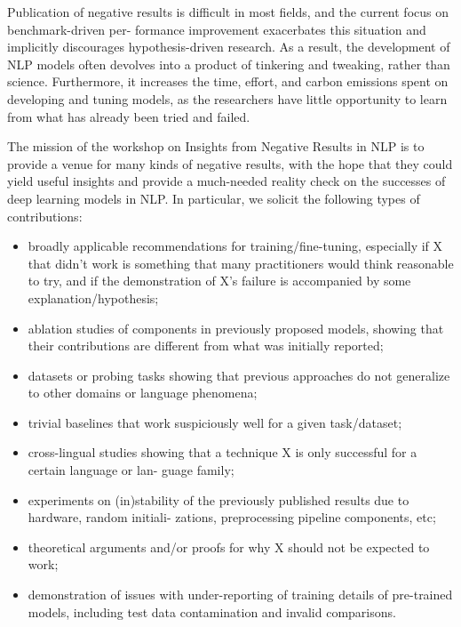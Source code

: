 \documentclass[11pt,oneside]{book}
\begin{document}
Publication of negative results is difficult in most fields, and the current focus on benchmark-driven per-
formance improvement exacerbates this situation and implicitly discourages hypothesis-driven research.
As a result, the development of NLP models often devolves into a product of tinkering and tweaking,
rather than science. Furthermore, it increases the time, effort, and carbon emissions spent on developing
and tuning models, as the researchers have little opportunity to learn from what has already been tried
and failed.

The mission of the workshop on Insights from Negative Results in NLP is to provide a venue for many
kinds of negative results, with the hope that they could yield useful insights and provide a much-needed
reality check on the successes of deep learning models in NLP. In particular, we solicit the following
types of contributions:
\begin{itemize}
    \item broadly applicable recommendations for training/fine-tuning, especially if X that didn’t work is
something that many practitioners would think reasonable to try, and if the demonstration of X’s
failure is accompanied by some explanation/hypothesis;
\item  ablation studies of components in previously proposed models, showing that their contributions
are different from what was initially reported;
\item  datasets or probing tasks showing that previous approaches do not generalize to other domains or
language phenomena;
\item  trivial baselines that work suspiciously well for a given task/dataset;
\item  cross-lingual studies showing that a technique X is only successful for a certain language or lan-
guage family;
\item  experiments on (in)stability of the previously published results due to hardware, random initiali-
zations, preprocessing pipeline components, etc;
\item  theoretical arguments and/or proofs for why X should not be expected to work;
\item  demonstration of issues with under-reporting of training details of pre-trained models, including
test data contamination and invalid comparisons.

\end{itemize}
\end{document}
